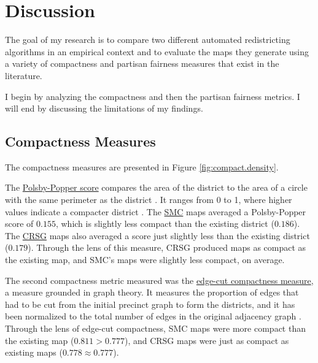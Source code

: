 \section{Discussion}
\label{sec:disc}

The goal of my research is to compare two different automated redistricting algorithms in an empirical context and to evaluate the maps they generate using a variety of compactness and partisan fairness measures that exist in the literature. 

I begin by analyzing the compactness and then the partisan fairness metrics. I will end by discussing the limitations of my findings. 

\subsection{Compactness Measures}

The compactness measures are presented in Figure \ref{fig:compact.density}. 

The \hyperref[sec:polsbypopper]{Polsby-Popper score} compares the area of the district to the area of a circle with the same perimeter as the district \parencite{polsby1991}. It ranges from 0 to 1, where higher values indicate a compacter district \parencite{polsby1991}. The \hyperref[sec:smc]{SMC} maps averaged a Polsby-Popper score of $0.155$, which is slightly less compact than the existing district ($0.186$). The \hyperref[sec:crsg]{CRSG} maps also averaged a score just slightly less than the existing district ($0.179$). Through the lens of this measure, CRSG produced maps as compact as the existing map, and SMC's maps were slightly less compact, on average. 

The second compactness metric measured was the \hyperref[sec:edgecut]{edge-cut compactness measure}, a measure grounded in graph theory. It measures the proportion of edges that had to be cut from the initial precinct graph to form the districts, and it has been normalized to the total number of edges in the original adjacency graph \parencite{dube2016}. Through the lens of edge-cut compactness, SMC maps were more compact than the existing map ($0.811 > 0.777$), and CRSG maps were just as compact as existing maps ($0.778 \approx 0.777$). 

